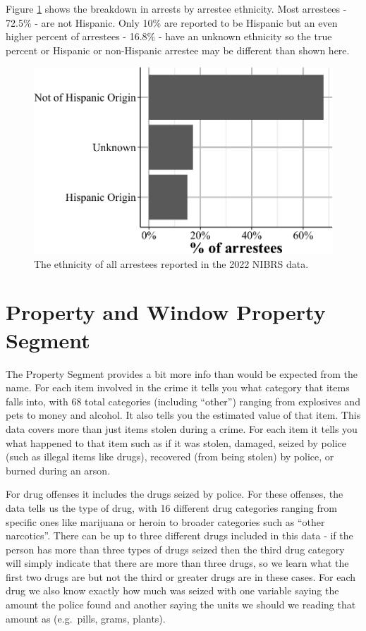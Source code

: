 \documentclass[
  12pt,
  openany]{book}
\begin{document}
Figure \ref{fig:arresteeEthnicity} shows the breakdown in arrests by arrestee ethnicity. Most arrestees - 72.5\% - are not Hispanic. Only 10\% are reported to be Hispanic but an even higher percent of arrestees - 16.8\% - have an unknown ethnicity so the true percent or Hispanic or non-Hispanic arrestee may be different than shown here.

\begin{figure}

{\centering \includegraphics[width=0.9\linewidth]{16_nibrs_arrestee_files/figure-latex/arresteeEthnicity-1} 

}

\caption{The ethnicity of all arrestees reported in the 2022 NIBRS data.}\label{fig:arresteeEthnicity}
\end{figure}

\chapter{Property and Window Property Segment}\label{property}

The Property Segment provides a bit more info than would be expected from the name. For each item involved in the crime it tells you what category that items falls into, with 68 total categories (including ``other'') ranging from explosives and pets to money and alcohol. It also tells you the estimated value of that item. This data covers more than just items stolen during a crime. For each item it tells you what happened to that item such as if it was stolen, damaged, seized by police (such as illegal items like drugs), recovered (from being stolen) by police, or burned during an arson.

For drug offenses it includes the drugs seized by police. For these offenses, the data tells us the type of drug, with 16 different drug categories ranging from specific ones like marijuana or heroin to broader categories such as ``other narcotics''. There can be up to three different drugs included in this data - if the person has more than three types of drugs seized then the third drug category will simply indicate that there are more than three drugs, so we learn what the first two drugs are but not the third or greater drugs are in these cases. For each drug we also know exactly how much was seized with one variable saying the amount the police found and another saying the units we should we reading that amount as (e.g.~pills, grams, plants).
\end{document}
